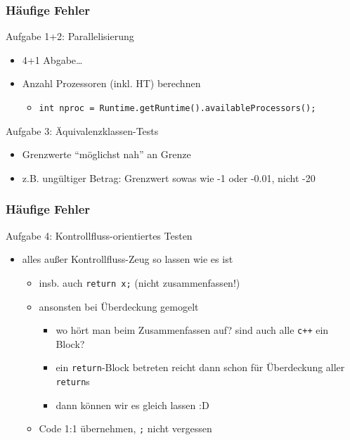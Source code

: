 \documentclass[18pt]{beamer}
\begin{document}
	\begin{frame}
		\frametitle{Häufige Fehler}
		\begin{block}{Aufgabe 1+2: Parallelisierung}
			\begin{itemize}
				\pause
				\item 4+1 Abgabe\dots\pause
				\item Anzahl Prozessoren (inkl. HT) berechnen
				\begin{itemize}
					\item \texttt{int nproc = Runtime.getRuntime().availableProcessors();}
				\end{itemize}
			\end{itemize}
			\end{block}
		\pause 
		\begin{block}{Aufgabe 3: Äquivalenzklassen-Tests}
			\begin{itemize}
				\item Grenzwerte \enquote{möglichst nah} an Grenze 
				\item z.B. ungültiger Betrag: Grenzwert sowas wie -1 oder -0.01, nicht -20
			\end{itemize}
		\end{block}
	\end{frame}

	\begin{frame}[fragile]
		\frametitle{Häufige Fehler}
		\begin{block}{Aufgabe 4: Kontrollfluss-orientiertes Testen}
			\begin{itemize}
				\pause 
				\item alles außer Kontrollfluss-Zeug so lassen wie es ist
				\begin{itemize}
					\item insb. auch \texttt{return x;} (nicht zusammenfassen!) \pause
					\item ansonsten bei Überdeckung gemogelt 
					\begin{itemize}
						\item wo hört man beim Zusammenfassen auf? sind auch alle \texttt{c++} ein Block?
						\item ein \texttt{return}-Block betreten reicht dann schon für Überdeckung aller \texttt{return}s
						\item dann können wir es gleich lassen :D
					\end{itemize} \pause
					\item Code 1:1 übernehmen, \texttt{;} nicht vergessen
				\end{itemize}
			\end{itemize}
		\end{block}
	\end{frame}
\end{document}
